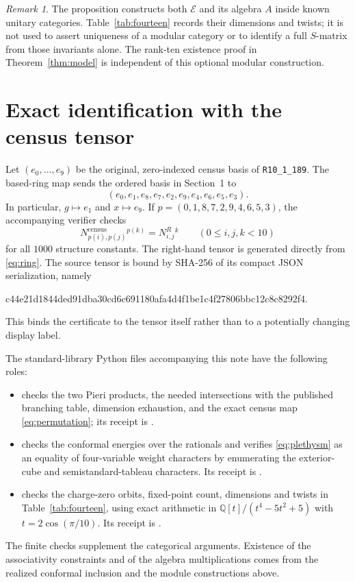 \documentclass[11pt]{amsart}
\theoremstyle{remark}
\newtheorem{remark}[theorem]{Remark}
\newcommand{\E}{\mathcal E}
\begin{document}
\begin{remark}
The proposition constructs both $\E$ and its algebra $A$ inside known
unitary categories. Table~\ref{tab:fourteen} records their dimensions
and twists; it is not used to assert uniqueness of a modular category
or to identify a full $S$-matrix from those invariants alone. The
rank-ten existence proof in Theorem~\ref{thm:model} is independent of
this optional modular construction.
\end{remark}

\appendix
\section{Exact identification with the census tensor}
\label{sec:certificate}

Let $(e_0,\ldots,e_9)$ be the original, zero-indexed census basis of
\texttt{R10\_1\_189}. The based-ring map sends the ordered basis in
Section~1 to
\begin{equation}\label{eq:permutation}
 (e_0,e_1,e_8,e_7,e_2,e_9,e_4,e_6,e_5,e_3).
\end{equation}
In particular, $g\mapsto e_1$ and $x\mapsto e_9$. If
$p=(0,1,8,7,2,9,4,6,5,3)$, the accompanying verifier checks
\[
 N^{\mathrm{census}}_{p(i),p(j)}{}^{p(k)}
 =N^{R}_{i,j}{}^k\qquad(0\leq i,j,k<10)
\]
for all $1000$ structure constants. The right-hand tensor is generated
directly from \eqref{eq:ring}. The source tensor is bound by SHA-256
of its compact JSON serialization, namely
\begin{center}
\small\ttfamily
c44e21d1844ded91dba30cd6c691180afa4d4f1be1c4f27806bbc12c8c8292f4.
\end{center}
This binds the certificate to the tensor itself rather than to a
potentially changing display label.

The standard-library Python files accompanying this note have the
following roles:
\begin{itemize}
\item {} checks the two Pieri products,
the needed intersections with the published branching table, dimension
exhaustion, and the exact census map \eqref{eq:permutation}; its receipt
is .
\item {} checks the conformal energies
over the rationals and verifies \eqref{eq:plethysm} as an equality of
four-variable weight characters by enumerating the exterior-cube and
semistandard-tableau characters. Its receipt is
.
\item {} checks the charge-zero orbits,
fixed-point count, dimensions and twists in Table~\ref{tab:fourteen},
using exact arithmetic in
$\mathbb Q[t]/(t^4-5t^2+5)$ with $t=2\cos(\pi/10)$.
Its receipt is .
\end{itemize}
The finite checks supplement the categorical arguments. Existence of
the associativity constraints and of the algebra multiplications comes
from the realized conformal inclusion and the module constructions
above.
\end{document}

